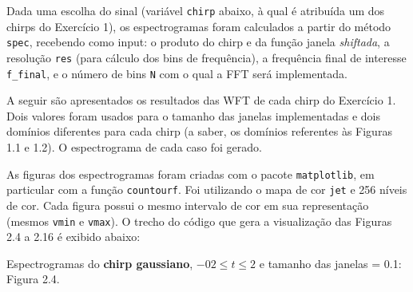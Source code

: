 Dada uma escolha do sinal (variável \texttt{chirp} abaixo, à qual é atribuída um dos chirps do Exercício 1), os espectrogramas foram calculados a partir do método \texttt{spec}, recebendo como input: o produto do chirp e da função janela \textit{shiftada}, a resolução \texttt{res} (para cálculo dos bins de frequência), a frequência final de interesse \texttt{f\_final}, e o número de bins \texttt{N} com o qual a FFT será implementada.



A seguir são apresentados os resultados das WFT de cada chirp do Exercício 1. Dois valores foram usados para o tamanho das janelas implementadas e dois domínios diferentes para cada chirp (a saber, os domínios referentes às Figuras 1.1 e 1.2). O espectrograma de cada caso foi gerado.

As figuras dos espectrogramas foram criadas com o pacote \texttt{matplotlib}, em particular com a função \texttt{countourf}. Foi utilizando o mapa de cor \texttt{jet} e 256 níveis de cor. Cada figura possui o mesmo intervalo de cor em sua representação (mesmos \texttt{vmin} e \texttt{vmax}). O trecho do código que gera a visualização das Figuras 2.4 a 2.16 é exibido abaixo:




Espectrogramas do \textbf{chirp gaussiano}, $-02 \leq t \leq 2$ e tamanho das janelas = 0.1: Figura 2.4.

